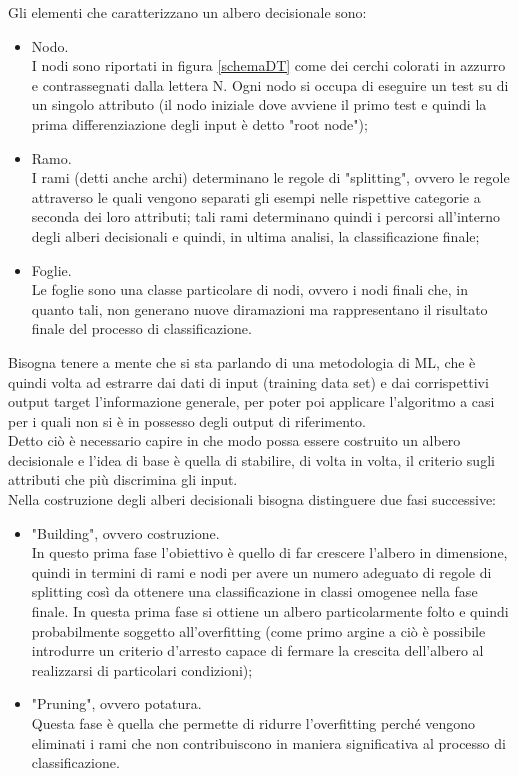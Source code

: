 Gli elementi che caratterizzano un albero decisionale sono:
\begin{itemize}
	\item Nodo. \\
	I nodi sono riportati in figura \ref{schemaDT} come dei cerchi colorati in azzurro e contrassegnati dalla lettera N. Ogni nodo si occupa di eseguire un test su di un singolo attributo (il nodo iniziale dove avviene il primo test e quindi la prima differenziazione degli input è detto "root node");
	\item Ramo. \\
	I rami (detti anche archi) determinano le regole di "splitting", ovvero le regole attraverso le quali vengono separati gli esempi nelle rispettive categorie a seconda dei loro attributi; tali rami determinano quindi i percorsi all'interno degli alberi decisionali e quindi, in ultima analisi, la classificazione finale;
	\item Foglie. \\
	Le foglie sono una classe particolare di nodi, ovvero i nodi finali che, in quanto tali, non generano nuove diramazioni ma rappresentano il risultato finale del processo di classificazione.
\end{itemize}

Bisogna tenere a mente che si sta parlando di una metodologia di ML, che è quindi volta ad estrarre dai dati di input (training data set) e dai corrispettivi output target l'informazione generale, per poter poi applicare l'algoritmo a casi per i quali non si è in possesso degli output di riferimento.\\
Detto ciò è necessario capire in che modo possa essere costruito un albero decisionale e l'idea di base è quella di stabilire, di volta in volta, il criterio sugli attributi che più discrimina gli input. \\
Nella costruzione degli alberi decisionali bisogna distinguere due fasi successive:
\begin{itemize}
	\item "Building", ovvero costruzione.\\
	In questo prima fase l'obiettivo è quello di far crescere l'albero in dimensione, quindi in termini di rami e nodi per avere un numero adeguato di regole di splitting così da ottenere una classificazione in classi omogenee nella fase finale. In questa prima fase si ottiene un albero particolarmente folto e quindi probabilmente soggetto all'overfitting (come primo argine a ciò è possibile introdurre un criterio d'arresto capace di fermare la crescita dell'albero al realizzarsi di particolari condizioni);
	\item "Pruning", ovvero potatura.\\
	Questa fase è quella che permette di ridurre l'overfitting perché vengono eliminati i rami che non contribuiscono in maniera significativa al processo di classificazione.
	
\end{itemize} 


